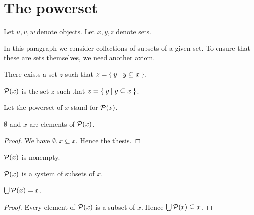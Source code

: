 \documentclass[../../set-theory.ftl.tex]{subfiles}
\begin{document}
  \section{The powerset}

  \begin{forthel}
  \end{forthel}

  \begin{forthel}
    Let $u,v,w$ denote objects.
    Let $x,y,z$ denote sets.
  \end{forthel}

  \noindent In this paragraph we consider collections of subsets of a given set.
  To ensure that these are sets themselves, we need another axiom.

  \begin{forthel}
    \begin{axiom}[Powerset]\label{SetTheory_01_02_516997}
      There exists a set $z$ such that $z = \Set{y | y \subseteq x}$.
    \end{axiom}

    \begin{definition}
      $\mathcal{P}(x)$ is the set $z$ such that $z = \Set{y | y \subseteq x}$.
    \end{definition}

    Let the powerset of $x$ stand for $\mathcal{P}(x)$.

    \begin{proposition}\label{SetTheory_01_02_481481}
      $\emptyset$ and $x$ are elements of $\mathcal{P}(x)$.
    \end{proposition}
    \begin{proof}
      We have $\emptyset, x \subseteq x$.
      Hence the thesis.
    \end{proof}

    \begin{corollary}\label{SetTheory_01_02_671341}
      $\mathcal{P}(x)$ is nonempty.
    \end{corollary}

    \begin{proposition}\label{SetTheory_01_02_833606}
      $\mathcal{P}(x)$ is a system of subsets of $x$.
    \end{proposition}

    \begin{proposition}\label{SetTheory_01_02_706547}
      $\bigcup \mathcal{P}(x) = x$.
    \end{proposition}
    \begin{proof}
      Every element of $\mathcal{P}(x)$ is a subset of $x$.
      Hence $\bigcup \mathcal{P}(x) \subseteq x$.


\end{proof}
\end{forthel}
\end{document}
